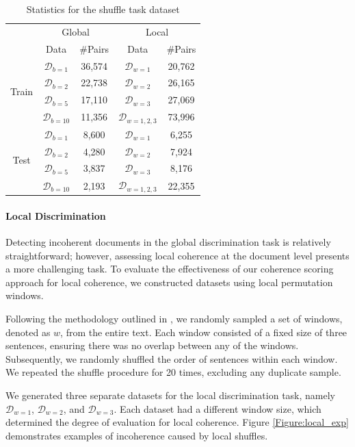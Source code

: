 \documentclass[letterpaper]{article}
\begin{document}
\begin{table}[t!]
\centering
\small
\begin{tabular}{@{}ccc|cc}
\toprule
& \multicolumn{2}{c|}{Global} & \multicolumn{2}{c}{Local} \\
\cmidrule(lr){2-3} \cmidrule(lr){4-5}
& Data & \#Pairs & Data & \#Pairs \\
\midrule
\multirow{4}{*}{Train} & $\mathcal{D}_{b=1}$ &  36,574 & $\mathcal{D}_{w=1}$  &20,762 \\
& $\mathcal{D}_{b=2}$ & 22,738  & $\mathcal{D}_{w=2}$ &26,165  \\
& $\mathcal{D}_{b=5}$ & 17,110 & $\mathcal{D}_{w=3}$ &27,069 \\
& $\mathcal{D}_{b=10}$ & 11,356 & $\mathcal{D}_{w=1,2,3}$ &73,996 \\
\midrule
\multirow{4}{*}{Test} & $\mathcal{D}_{b=1}$ &8,600 & $\mathcal{D}_{w=1}$  &6,255 \\
& $\mathcal{D}_{b=2}$ &4,280 & $\mathcal{D}_{w=2}$  &7,924 \\
& $\mathcal{D}_{b=5}$ &  3,837 & $\mathcal{D}_{w=3}$ &8,176 \\
& $\mathcal{D}_{b=10}$ & 2,193 & $\mathcal{D}_{w=1,2,3}$  &22,355 \\
\bottomrule
\end{tabular}
\caption{Statistics for the shuffle task dataset}
\label{datastat}
\end{table}

\paragraph{Local Discrimination}\label{exp:local} Detecting incoherent documents in the global discrimination task is relatively straightforward; however, assessing local coherence at the document level presents a more challenging task. To evaluate the effectiveness of our coherence scoring approach for local coherence, we constructed datasets using local permutation windows.

Following the methodology outlined in \citet{moon-etal-2019-unified}, we randomly sampled a set of windows, denoted as $w$, from the entire text. Each window consisted of a fixed size of three sentences, ensuring there was no overlap between any of the windows. Subsequently, we randomly shuffled the order of sentences within each window. We repeated the shuffle procedure for 20 times, excluding any duplicate sample.

We generated three separate datasets for the local discrimination task, namely $\mathcal{D}_{w=1}$, $\mathcal{D}_{w=2}$, and $\mathcal{D}_{w=3}$. Each dataset had a different window size, which determined the degree of evaluation for local coherence. Figure \ref{Figure:local_exp} demonstrates examples of incoherence caused by local shuffles.
\end{document}
